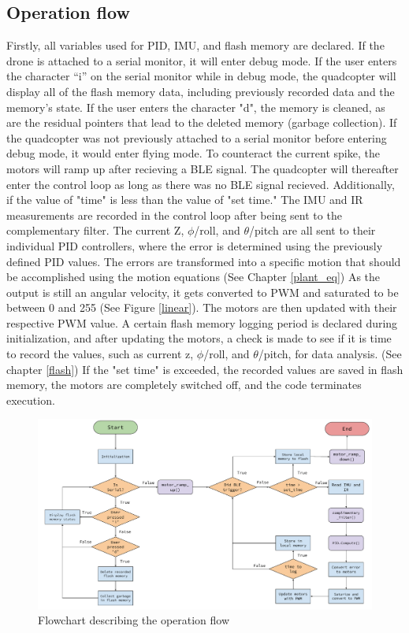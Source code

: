 \subsection{Operation flow}

Firstly, all variables used for PID, IMU, and flash memory are declared. If the drone is attached to a serial monitor, it will enter debug mode. If the user enters the character “i” on the serial monitor while in debug mode, the quadcopter will display all of the flash memory data, including previously recorded data and the memory's state. 
If the user enters the character "d", the memory is cleaned, as are the residual pointers that lead to the deleted memory (garbage collection). If the quadcopter was not previously attached to a serial monitor before entering debug mode, it would enter flying mode. 
To counteract the current spike, the motors will ramp up after recieving a BLE signal. The quadcopter will thereafter enter the control loop as long as there was no BLE signal recieved. Additionally, if the value of "time" is less than the value of "set time." The IMU and IR measurements are recorded in the control loop after being sent to the complementary filter. The current Z, $\phi$/roll, and $\theta$/pitch are all sent to their individual PID controllers, where the error is determined using the previously defined PID values. 
The errors are transformed into a specific motion that should be accomplished using the motion equations (See Chapter \ref{plant_eq}) 
As the output is still an angular velocity, it gets converted to PWM and saturated to be between 0 and 255 (See Figure \ref{linear}). 
The motors are then updated with their respective PWM value. 
A certain flash memory logging period is declared during initialization, and after updating the motors, a check is made to see if it is time to record the values, such as current z, $\phi$/roll, and $\theta$/pitch, for data analysis. (See chapter \ref{flash}) 
If the "set time" is exceeded, the recorded values are saved in flash memory, the motors are completely switched off, and the code terminates execution.

\begin{figure}[!ht]
    \begin{center}
    \includegraphics[width=\textwidth]{pictures/flowchart_pdf.pdf}
    \end{center}
    \caption{Flowchart describing the operation flow}
    \label{fig:flowchart}
\end{figure}